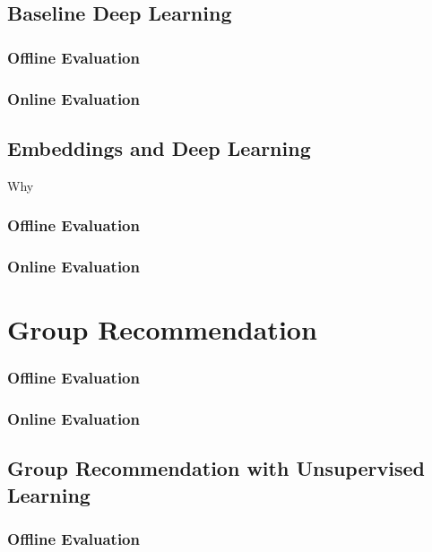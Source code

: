 \subsection{Baseline Deep Learning}

\subsubsection{Offline Evaluation}

\subsubsection{Online Evaluation}

\subsection{Embeddings and Deep Learning}

Why 

\subsubsection{Offline Evaluation}

\subsubsection{Online Evaluation}

\section{Group Recommendation}

\subsubsection{Offline Evaluation}

\subsubsection{Online Evaluation}

\subsection{Group Recommendation with Unsupervised Learning}

\subsubsection{Offline Evaluation}

